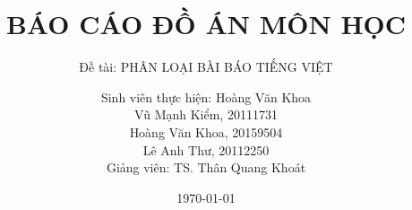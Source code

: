 \title[Báo cáo Đồ án Môn học]{BÁO CÁO ĐỒ ÁN MÔN HỌC}
\subtitle[Phân loại bài báo tiếng Việt]{Đề tài: PHÂN LOẠI BÀI BÁO TIẾNG VIỆT}

\author[Hoàng Văn Khoa, Vũ Mạnh Kiểm, Lê Anh Thư]
{
Sinh viên thực hiện: Hoàng Văn Khoa \\
Vũ Mạnh Kiểm, 20111731 \\
Hoàng Văn Khoa, 20159504 \\
Lê Anh Thư, 20112250 \\
Giảng viên: TS. Thân Quang Khoát \\
}

\date{\today} %
